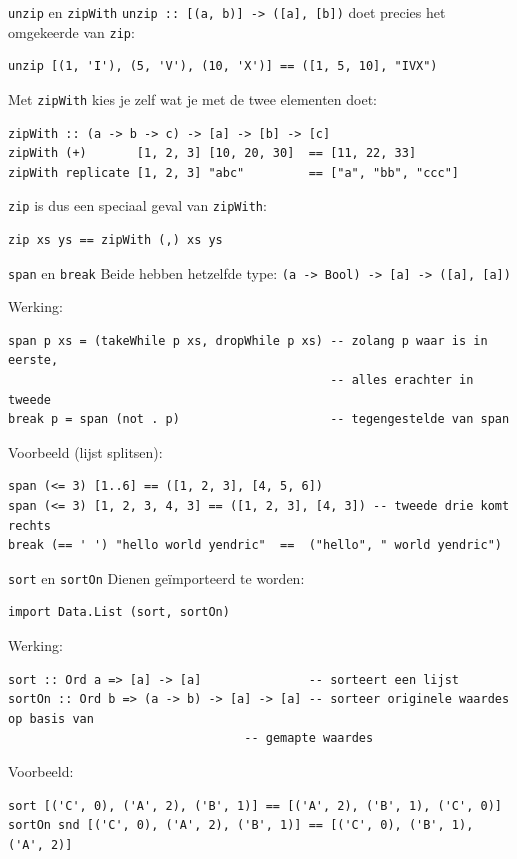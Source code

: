 \documentclass[aspectratio=169,11pt]{beamer}
\newcommand{\hs}{\lstinline[style=hsinline]}
\begin{document}
\begin{frame}[fragile]{\texttt{unzip} en \texttt{zipWith}}
  \hs|unzip :: [(a, b)] -> ([a], [b])| doet precies het omgekeerde van \hs|zip|:
\begin{lstlisting}
unzip [(1, 'I'), (5, 'V'), (10, 'X')] == ([1, 5, 10], "IVX")
\end{lstlisting}
  Met \hs|zipWith| kies je zelf wat je met de twee elementen doet:
\begin{lstlisting}
zipWith :: (a -> b -> c) -> [a] -> [b] -> [c]
zipWith (+)       [1, 2, 3] [10, 20, 30]  == [11, 22, 33]
zipWith replicate [1, 2, 3] "abc"         == ["a", "bb", "ccc"]
\end{lstlisting}
  \hs|zip| is dus een speciaal geval van \hs|zipWith|:
\begin{lstlisting}
zip xs ys == zipWith (,) xs ys
\end{lstlisting}
\end{frame}


\begin{frame}[fragile]{\texttt{span} en \texttt{break}}
  Beide hebben hetzelfde type: \hs|(a -> Bool) -> [a] -> ([a], [a])|
  
  Werking:
\begin{lstlisting}
span p xs = (takeWhile p xs, dropWhile p xs) -- zolang p waar is in eerste,
                                             -- alles erachter in tweede
break p = span (not . p)                     -- tegengestelde van span
\end{lstlisting}
Voorbeeld (lijst splitsen):
\begin{lstlisting}
span (<= 3) [1..6] == ([1, 2, 3], [4, 5, 6])
span (<= 3) [1, 2, 3, 4, 3] == ([1, 2, 3], [4, 3]) -- tweede drie komt rechts
break (== ' ') "hello world yendric"  ==  ("hello", " world yendric")
\end{lstlisting}
\end{frame}

\begin{frame}[fragile]{\texttt{sort} en \texttt{sortOn}}
Dienen geïmporteerd te worden: 
\begin{lstlisting}
import Data.List (sort, sortOn)
\end{lstlisting}
Werking:
\begin{lstlisting}
sort :: Ord a => [a] -> [a]               -- sorteert een lijst
sortOn :: Ord b => (a -> b) -> [a] -> [a] -- sorteer originele waardes op basis van 
                                 -- gemapte waardes
\end{lstlisting}
Voorbeeld:
\begin{lstlisting}
sort [('C', 0), ('A', 2), ('B', 1)] == [('A', 2), ('B', 1), ('C', 0)]
sortOn snd [('C', 0), ('A', 2), ('B', 1)] == [('C', 0), ('B', 1), ('A', 2)]
\end{lstlisting}
\end{frame}
\end{document}
